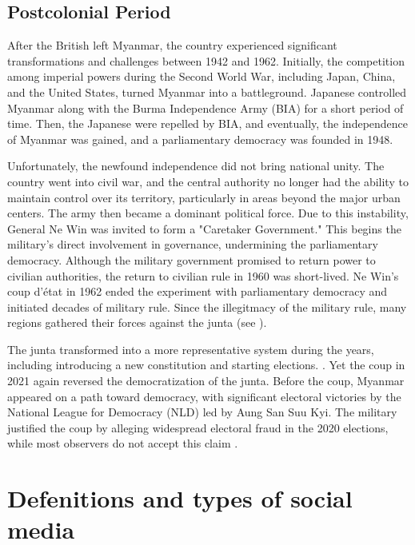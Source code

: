 \documentclass[man,floatsintext]{apa7}
\begin{document}
\subsection{Postcolonial Period}

After the British left Myanmar, the country experienced significant transformations and challenges between 1942 and 1962. Initially, the competition among imperial powers during the Second World War, including Japan, China, and the United States, turned Myanmar into a battleground. Japanese controlled Myanmar along with the Burma Independence Army (BIA) for a short period of time. Then, the Japanese were repelled by BIA, and eventually, the independence of Myanmar was gained, and a parliamentary democracy was founded in 1948. \autocite[225-238]{aung-thwinHistoryMyanmarAncient2012}

Unfortunately, the newfound independence did not bring national unity. The country went into civil war, and the central authority no longer had the ability to maintain control over its territory, particularly in areas beyond the major urban centers. The army then became a dominant political force. Due to this instability, General Ne Win was invited to form a "Caretaker Government." This begins the military's direct involvement in governance, undermining the parliamentary democracy. Although the military government promised to return power to civilian authorities, the return to civilian rule in 1960 was short-lived. Ne Win's coup d'état in 1962 ended the experiment with parliamentary democracy and initiated decades of military rule. \autocite[238-244]{aung-thwinHistoryMyanmarAncient2012}  Since the illegitmacy of the military rule, many regions gathered their forces against the junta (see \textcite[34]{smithEthnicGroupsBurma1994}).

The junta transformed into a more representative system during the years, including introducing a new constitution and starting elections. \autocite[276-285]{aung-thwinHistoryMyanmarAncient2012}. Yet the coup in 2021 again reversed the democratization of the junta. Before the coup, Myanmar appeared on a path toward democracy, with significant electoral victories by the National League for Democracy (NLD) led by Aung San Suu Kyi. The military justified the coup by alleging widespread electoral fraud in the 2020 elections, while most observers do not accept this claim \autocite{ganesanMyanmar2021Military2023}.

\section{Defenitions and types of social media}
\end{document}
